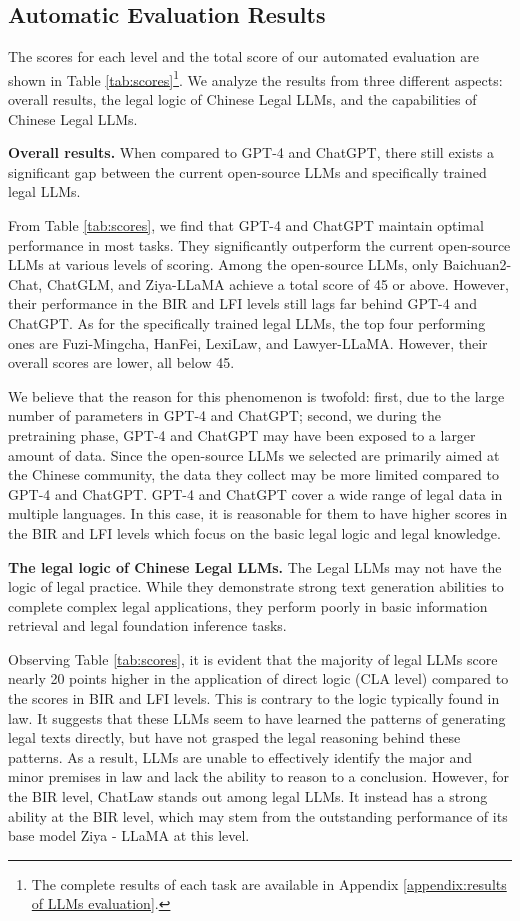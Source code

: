 \subsection{Automatic Evaluation Results}
\label{sec:automatic evaluation results}

The scores for each level and the total score of our automated evaluation are shown in Table \ref{tab:scores}\footnote{The complete results of each task are available in Appendix \ref{appendix:results of LLMs evaluation}.}.
We analyze the results from three different aspects: overall results, the legal logic of Chinese Legal LLMs, and the capabilities of Chinese Legal LLMs.

\textbf{Overall results.} When compared to GPT-4 and ChatGPT, there still exists a significant gap between the current open-source LLMs and specifically trained legal LLMs.

From Table \ref{tab:scores}, we find that GPT-4 and ChatGPT maintain optimal performance in most tasks. 
They significantly outperform the current open-source LLMs at various levels of scoring.
Among the open-source LLMs, only Baichuan2-Chat, ChatGLM, and Ziya-LLaMA achieve a total score of 45 or above. However, their performance in the BIR and LFI levels still lags far behind GPT-4 and ChatGPT.
As for the specifically trained legal LLMs, the top four performing ones are Fuzi-Mingcha, HanFei, LexiLaw, and Lawyer-LLaMA. However, their overall scores are lower, all below 45.

We believe that the reason for this phenomenon is twofold: first, due to the large number of parameters in GPT-4 and ChatGPT; second, we during the pretraining phase, GPT-4 and ChatGPT may have been exposed to a larger amount of data. 
Since the open-source LLMs we selected are primarily aimed at the Chinese community, the data they collect may be more limited compared to GPT-4 and ChatGPT. 
GPT-4 and ChatGPT cover a wide range of legal data in multiple languages. In this case, it is reasonable for them to have higher scores in the BIR and LFI levels which focus on the basic legal logic and legal knowledge.

\textbf{ The legal logic of Chinese Legal LLMs.} 
The Legal LLMs may not have the logic of legal practice. While they demonstrate strong text generation abilities to complete complex legal applications, they perform poorly in basic information retrieval and legal foundation inference tasks.

Observing Table \ref{tab:scores}, it is evident that the majority of legal LLMs score nearly 20 points higher in the application of direct logic (CLA level) compared to the scores in BIR and LFI levels. 
This is contrary to the logic typically found in law. 
It suggests that these LLMs seem to have learned the patterns of generating legal texts directly, but have not grasped the legal reasoning behind these patterns. 
As a result, LLMs are unable to effectively identify the major and minor premises in law and lack the ability to reason to a conclusion.
However, for the BIR level, ChatLaw stands out among legal LLMs.
It instead has a strong ability at the BIR level, which may stem from the outstanding performance of its base model Ziya - LLaMA at this level.

